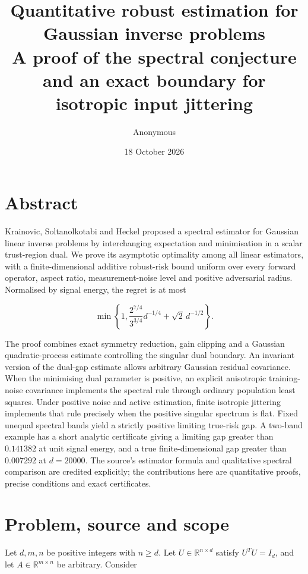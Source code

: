 \documentclass[11pt,a4paper]{article}
\title{Quantitative robust estimation for Gaussian inverse
problems\\[0.5em]{\large A proof of the spectral conjecture and an exact
boundary for isotropic input jittering}}
\author{Anonymous}
\date{18 October 2026}
\begin{document}
\maketitle

\hypertarget{abstract}{%
\section*{Abstract}\label{abstract}}

Krainovic, Soltanolkotabi and Heckel proposed a spectral estimator for
Gaussian linear inverse problems by interchanging expectation and
minimisation in a scalar trust-region dual. We prove its asymptotic
optimality among all linear estimators, with a finite-dimensional
additive robust-risk bound uniform over every forward operator, aspect
ratio, measurement-noise level and positive adversarial radius.
Normalised by signal energy, the regret is at most

\[
\min\left\{1,\frac{2^{7/4}}{3^{3/4}}d^{-1/4}+\sqrt2\,d^{-1/2}\right\}.
\]

The proof combines exact symmetry reduction, gain clipping and a
Gaussian quadratic-process estimate controlling the singular dual
boundary. An invariant version of the dual-gap estimate allows arbitrary
Gaussian residual covariance. When the minimising dual parameter is positive, an explicit
anisotropic training-noise covariance implements the spectral rule
through ordinary population least squares. Under positive noise and
active estimation, finite isotropic jittering implements that rule
precisely when the positive singular spectrum is flat. Fixed unequal
spectral bands yield a strictly positive limiting true-risk gap. A
two-band example has a short analytic certificate giving a limiting gap
greater than \(0.141382\) at unit signal energy, and a true
finite-dimensional gap greater than \(0.007292\) at \(d=20000\). The
source's estimator formula and qualitative spectral comparison are
credited explicitly; the contributions here are quantitative proofs,
precise conditions and exact certificates.

\hypertarget{problem-source-and-scope}{%
\section{Problem, source and scope}\label{problem-source-and-scope}}

Let \(d,m,n\) be positive integers with \(n\ge d\). Let
\(U\in\mathbb R^{n\times d}\) satisfy \(U^TU=I_d\), and let
\(A\in\mathbb R^{m\times n}\) be arbitrary. Consider
\end{document}
